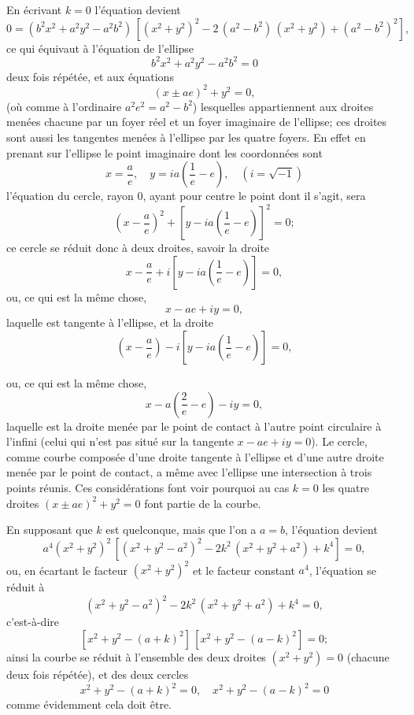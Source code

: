 \documentclass[11pt,a4paper]{article}
\theoremstyle{plain}
\theoremstyle{definition}
\begin{document}
En \'{e}crivant $k=0$ l'\'{e}quation devient
\[
0 = (b^2x^2 + a^2y^2 - a^2b^2)\,[(x^2+y^2)^2 - 2\,(a^2-b^2)\,(x^2+y^2) + (a^2-b^2)^2],
\]
ce qui \'{e}quivaut \`{a} l'\'{e}quation de l'ellipse
\[
b^2x^2 + a^2y^2 - a^2b^2 = 0
\]
deux fois r\'{e}p\'{e}t\'{e}e, et aux \'{e}quations
\[
(x \pm ae)^2 + y^2 = 0,
\]
(o\`{u} comme \`{a} l'ordinaire $a^2e^2 = a^2 - b^2$) lesquelles appartiennent aux droites men\'{e}es chacune par un foyer r\'{e}el et un foyer imaginaire de l'ellipse; ces droites sont aussi les tangentes men\'{e}es \`{a} l'ellipse par les quatre foyers. En effet en prenant sur l'ellipse le point imaginaire dont les coordonn\'{e}es sont
\[
x = \frac{a}{e}, \quad y = ia\left(\frac{1}{e} - e\right), \quad (i = \sqrt{-1})
\]
l'\'{e}quation du cercle, rayon 0, ayant pour centre le point dont il s'agit, sera
\[
\left(x - \frac{a}{e}\right)^2 + \left[y - ia\left(\frac{1}{e} - e\right)\right]^2 = 0;
\]
ce cercle se r\'{e}duit donc \`{a} deux droites, savoir la droite
\[
x - \frac{a}{e} + i\left[y - ia\left(\frac{1}{e} - e\right)\right] = 0,
\]
ou, ce qui est la m\^{e}me chose,
\[
x - ae + iy = 0,
\]
laquelle est tangente \`{a} l'ellipse, et la droite
\[
\left(x - \frac{a}{e}\right) - i\left[y - ia\left(\frac{1}{e} - e\right)\right] = 0,
\]

\newpage
ou, ce qui est la m\^{e}me chose,
\[
x - a\left(\frac{2}{e} - e\right) - iy = 0,
\]
laquelle est la droite men\'{e}e par le point de contact \`{a} l'autre point circulaire \`{a} l'infini (celui qui n'est pas situ\'{e} sur la tangente $x - ae + iy = 0$). Le cercle, comme courbe compos\'{e}e d'une droite tangente \`{a} l'ellipse et d'une autre droite men\'{e}e par le point de contact, a m\^{e}me avec l'ellipse une intersection \`{a} trois points r\'{e}unis. Ces consid\'{e}rations font voir pourquoi au cas $k=0$ les quatre droites $(x \pm ae)^2 + y^2 = 0$ font partie de la courbe.

En supposant que $k$ est quelconque, mais que l'on a $a=b$, l'\'{e}quation devient
\[
a^4(x^2+y^2)^2\,[(x^2+y^2-a^2)^2 - 2k^2\,(x^2+y^2+a^2) + k^4] = 0,
\]
ou, en \'{e}cartant le facteur $(x^2+y^2)^2$ et le facteur constant $a^4$, l'\'{e}quation se r\'{e}duit \`{a}
\[
(x^2+y^2-a^2)^2 - 2k^2\,(x^2+y^2+a^2) + k^4 = 0,
\]
c'est-\`{a}-dire
\[
[x^2+y^2-(a+k)^2]\,[x^2+y^2-(a-k)^2] = 0;
\]
ainsi la courbe se r\'{e}duit \`{a} l'ensemble des deux droites $(x^2+y^2)=0$ (chacune deux fois r\'{e}p\'{e}t\'{e}e), et des deux cercles
\[
x^2+y^2-(a+k)^2=0, \quad x^2+y^2-(a-k)^2=0
\]
comme \'{e}videmment cela doit \^{e}tre.
\end{document}
